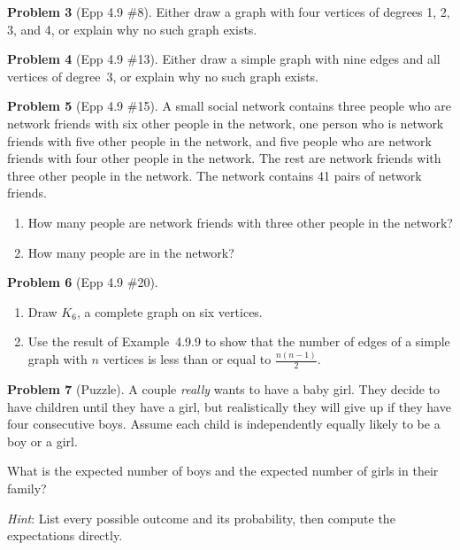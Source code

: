 \documentclass[11pt]{article}
\begin{document}
\bigskip

\noindent\textbf{Problem 3} (Epp 4.9 \#8). \;
Either draw a graph with four vertices of degrees 1, 2, 3, and 4,
or explain why no such graph exists.

\bigskip

\noindent\textbf{Problem 4} (Epp 4.9 \#13). \;
Either draw a simple graph with nine edges and all vertices of degree~3,
or explain why no such graph exists.

\bigskip

\noindent\textbf{Problem 5} (Epp 4.9 \#15). \;
A small social network contains three people who are network friends with
six other people in the network, one person who is network friends with
five other people in the network, and five people who are network friends
with four other people in the network.  The rest are network friends with
three other people in the network.  The network contains 41 pairs of
network friends.
\begin{enumerate}[label=\alph*.]
  \item How many people are network friends with three other people
        in the network?
  \item How many people are in the network?
\end{enumerate}

\bigskip

\noindent\textbf{Problem 6} (Epp 4.9 \#20).
\begin{enumerate}[label=\alph*.]
  \item Draw $K_6$, a complete graph on six vertices.
  \item Use the result of Example~4.9.9 to show that the number of edges
        of a simple graph with $n$ vertices is less than or equal to
        $\displaystyle\frac{n(n-1)}{2}$.
\end{enumerate}

\bigskip

\noindent\textbf{Problem 7} (Puzzle). \;
A couple \emph{really} wants to have a baby girl.  They decide to have
children until they have a girl, but realistically they will give up if
they have four consecutive boys.  Assume each child is independently
equally likely to be a boy or a girl.

\medskip
What is the expected number of boys and the expected number of girls
in their family?

\medskip\noindent
\emph{Hint}: List every possible outcome and its probability, then compute
the expectations directly.
\end{document}
